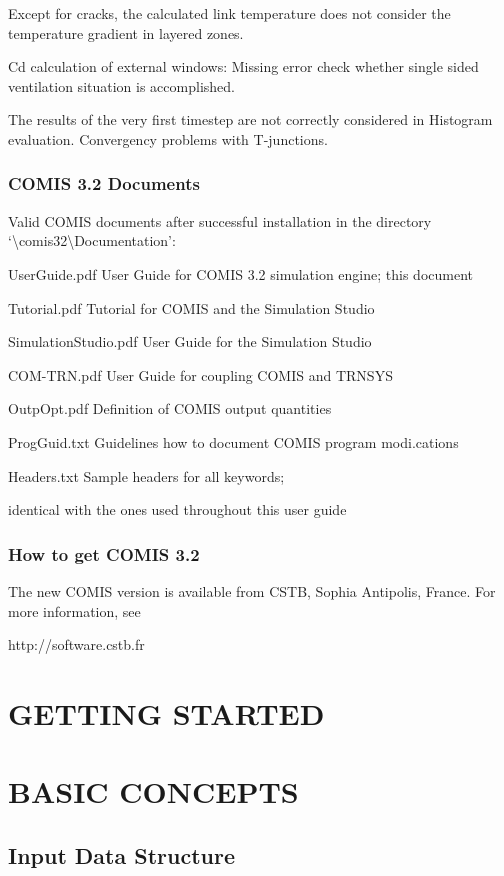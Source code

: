\documentclass[10pt]{book}
\begin{document}
Except for cracks, the calculated link temperature does not consider the temperature gradient in layered zones. 

Cd calculation of external windows: Missing error check whether single sided ventilation situation is accomplished.

The results of the very first timestep are not correctly considered in Histogram evaluation. 
Convergency problems with T-junctions. 


\subsection{COMIS 3.2 Documents}

Valid COMIS documents after successful installation in the directory `\textbackslash comis32\textbackslash Documentation':

UserGuide.pdf  User Guide for COMIS 3.2 simulation engine; this document

Tutorial.pdf  Tutorial for COMIS and the Simulation Studio

SimulationStudio.pdf  User Guide for the Simulation Studio

COM-TRN.pdf  User Guide for coupling COMIS and TRNSYS

OutpOpt.pdf  Definition of COMIS output quantities

ProgGuid.txt  Guidelines how to document COMIS program modi.cations

Headers.txt  Sample headers for all keywords;

identical with the ones used throughout this user guide

\subsection{How to get COMIS 3.2}

The new COMIS version is available from CSTB, Sophia Antipolis, France. For more information, see

http://software.cstb.fr

\chapter{GETTING STARTED}

\chapter{BASIC CONCEPTS}

\section{Input Data Structure}
\end{document}
